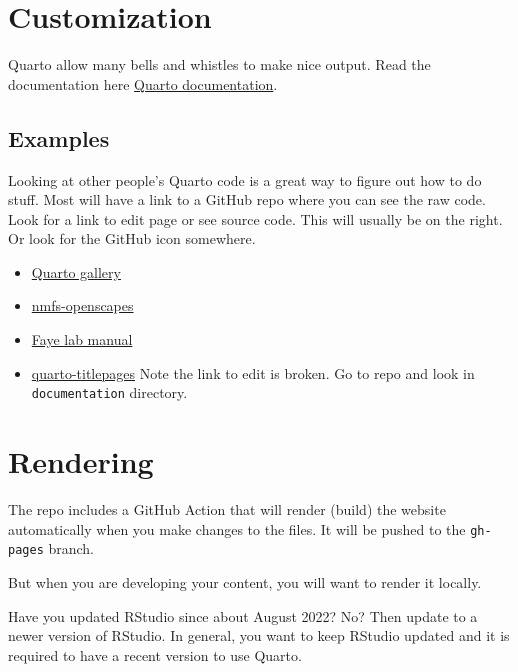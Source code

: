 \documentclass[
  11pt,
  letterpaper,
  oneside,
  open=any]{scrbook}
\providecommand{\tightlist}{%
  \setlength{\itemsep}{0pt}\setlength{\parskip}{0pt}}\usepackage{longtable,booktabs,array}
\begin{document}

\hypertarget{customization}{%
\chapter{Customization}\label{customization}}

Quarto allow many bells and whistles to make nice output. Read the
documentation here \href{https://quarto.org/docs/guide/}{Quarto
documentation}.

\hypertarget{examples}{%
\section{Examples}\label{examples}}

Looking at other people's Quarto code is a great way to figure out how
to do stuff. Most will have a link to a GitHub repo where you can see
the raw code. Look for a link to edit page or see source code. This will
usually be on the right. Or look for the GitHub icon somewhere.

\begin{itemize}
\tightlist
\item
  \href{https://quarto.org/docs/gallery/}{Quarto gallery}
\item
  \href{https://nmfs-openscapes.github.io/}{nmfs-openscapes}
\item
  \href{https://thefaylab.github.io/lab-manual/}{Faye lab manual}
\item
  \href{https://nmfs-opensci.github.io/quarto_titlepages/}{quarto-titlepages}
  Note the link to edit is broken. Go to repo and look in
  \texttt{documentation} directory.
\end{itemize}


\hypertarget{rendering}{%
\chapter{Rendering}\label{rendering}}

The repo includes a GitHub Action that will render (build) the website
automatically when you make changes to the files. It will be pushed to
the \texttt{gh-pages} branch.

But when you are developing your content, you will want to render it
locally.

Have you updated RStudio since about August 2022? No? Then update to a
newer version of RStudio. In general, you want to keep RStudio updated
and it is required to have a recent version to use Quarto.
\end{document}

